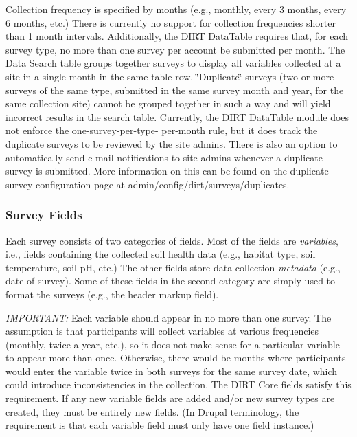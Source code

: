 Collection frequency is specified by months (e.\+g., monthly, every 3 months, every 6 months, etc.) There is currently no support for collection frequencies shorter than 1 month intervals. Additionally, the D\+I\+RT Data\+Table requires that, for each survey type, no more than one survey per account be submitted per month. The Data Search table groups together surveys to display all variables collected at a site in a single month in the same table row. \char`\"{}\+Duplicate\char`\"{} surveys (two or more surveys of the same type, submitted in the same survey month and year, for the same collection site) cannot be grouped together in such a way and will yield incorrect results in the search table. Currently, the D\+I\+RT Data\+Table module does not enforce the one-\/survey-\/per-\/type-\/ per-\/month rule, but it does track the duplicate surveys to be reviewed by the site admins. There is also an option to automatically send e-\/mail notifications to site admins whenever a duplicate survey is submitted. More information on this can be found on the duplicate survey configuration page at admin/config/dirt/surveys/duplicates.

\subsubsection*{Survey Fields}

Each survey consists of two categories of fields. Most of the fields are {\itshape variables}, i.\+e., fields containing the collected soil health data (e.\+g., habitat type, soil temperature, soil pH, etc.) The other fields store data collection {\itshape metadata} (e.\+g., date of survey). Some of these fields in the second category are simply used to format the surveys (e.\+g., the header markup field).

{\itshape I\+M\+P\+O\+R\+T\+A\+NT\+:} Each variable should appear in no more than one survey. The assumption is that participants will collect variables at various frequencies (monthly, twice a year, etc.), so it does not make sense for a particular variable to appear more than once. Otherwise, there would be months where participants would enter the variable twice in both surveys for the same survey date, which could introduce inconsistencies in the collection. The D\+I\+RT Core fields satisfy this requirement. If any new variable fields are added and/or new survey types are created, they must be entirely new fields. (In Drupal terminology, the requirement is that each variable field must only have one field instance.)

